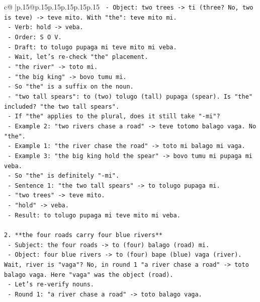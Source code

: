 \documentclass{article}
\begin{document}
{\begin{supertabular}{c@{$\;$}|p{.15\linewidth}@{}p{.15\linewidth}p{.15\linewidth}p{.15\linewidth}p{.15\linewidth}p{.15\linewidth}}
{{{\texttt{    {-} Object: two trees {-}> ti (three? No, two is teve) {-}> teve mito. With "the": teve mito mi.} \\
\texttt{    {-} Verb: hold {-}> veba.} \\
\texttt{    {-} Order: S O V.} \\
\texttt{    {-} Draft: to tolugo pupaga mi teve mito mi veba.} \\
\texttt{    {-} Wait, let's re{-}check "the" placement.} \\
\texttt{    {-} "the river" {-}> toto mi.} \\
\texttt{    {-} "the big king" {-}> bovo tumu mi.} \\
\texttt{    {-} So "the" is a suffix on the noun.} \\
\texttt{    {-} "two tall spears": to (two) tolugo (tall) pupaga (spear). Is "the" included? "the two tall spears".} \\
\texttt{    {-} If "the" applies to the plural, does it still take "{-}mi"?} \\
\texttt{    {-} Example 2: "two rivers chase a road" {-}> teve totomo balago vaga. No "the".} \\
\texttt{    {-} Example 1: "the river chase the road" {-}> toto mi balago mi vaga.} \\
\texttt{    {-} Example 3: "the big king hold the spear" {-}> bovo tumu mi pupaga mi veba.} \\
\texttt{    {-} So "the" is definitely "{-}mi".} \\
\texttt{    {-} Sentence 1: "the two tall spears" {-}> to tolugo pupaga mi.} \\
\texttt{    {-} "two trees" {-}> teve mito.} \\
\texttt{    {-} "hold" {-}> veba.} \\
\texttt{    {-} Result: to tolugo pupaga mi teve mito mi veba.} \\
\\ 
\texttt{2.  **the four roads carry four blue rivers**} \\
\texttt{    {-} Subject: the four roads {-}> to (four) balago (road) mi.} \\
\texttt{    {-} Object: four blue rivers {-}> to (four) bape (blue) vaga (river). Wait, river is "vaga"? No, in round 1 "a river chase a road" {-}> toto balago vaga. Here "vaga" was the object (road).} \\
\texttt{    {-} Let's re{-}verify nouns.} \\
\texttt{    {-} Round 1: "a river chase a road" {-}> toto balago vaga.} \\
}}}
\end{supertabular}}
\end{document}
